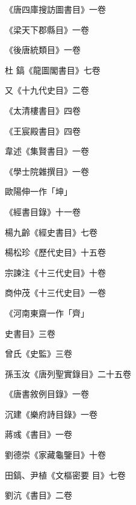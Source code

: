 \begin{pinyinscope}
 《唐四庫搜訪圖書目》一卷



 《梁天下郡縣目》一卷



 《後唐統類目》一卷



 杜
 鎬《龍圖閣書目》七卷



 又《十九代史目》二卷



 《太清樓書目》四卷



 《王宸殿書目》四卷



 韋述《集賢書目》一卷



 《學士院雜撰目》一卷



 歐陽伸一作「坤」



 《經書目錄》十一卷



 楊九齡《經史書目》七卷



 楊松珍《歷代史目》十五卷



 宗諫注《十三代史目》十卷



 商仲茂《十三代史目》一卷



 《河南東齋一作「齊」



 史書目》三卷



 曾氏《史監》三卷



 孫玉汝《唐列聖實錄目》二十五卷



 《唐書敘例目錄》一卷



 沉建《樂府詩目錄》一卷



 蔣彧《書目》一卷



 劉德崇《家藏龜鑒目》十卷



 田鎬、尹植《文樞密要
 目》七卷



 劉沆《書目》二卷




\end{pinyinscope}
